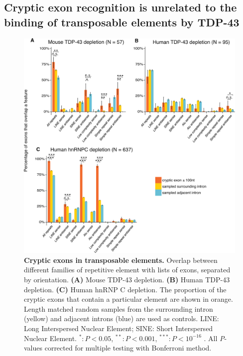\subsection{Cryptic exon recognition is unrelated to the binding of transposable elements by TDP-43}

\begin{figure}[h!]
	\centering
	\includegraphics[width=\textwidth]{Figures/03_cryptic_exons/Figure_3_repeat_elements.png}
	\caption[Cryptic exons in transposable elements]{
		\textbf{Cryptic exons in transposable elements.}
		Overlap between different families of repetitive element with lists of exons, separated by orientation. 
		\textbf{(A)} Mouse TDP-43 depletion. 
		\textbf{(B)} Human TDP-43 depletion. 
		\textbf{(C)} Human hnRNP C depletion. 
		The proportion of the cryptic exons that contain a particular element are shown in orange. Length matched random samples from the surrounding intron (yellow) and adjacent introns (blue) are used as controls. LINE: Long Interspersed Nuclear Element; SINE: Short Interspersed Nuclear Element.  $^*: P < 0.05$, $^{**}: P < 0.001$, $^{***}: P < 10^{-16}$ . All \textit{P}-values corrected for multiple testing with Bonferroni method.
	}
	\label{fig:cryptic_repeats}
\end{figure}

